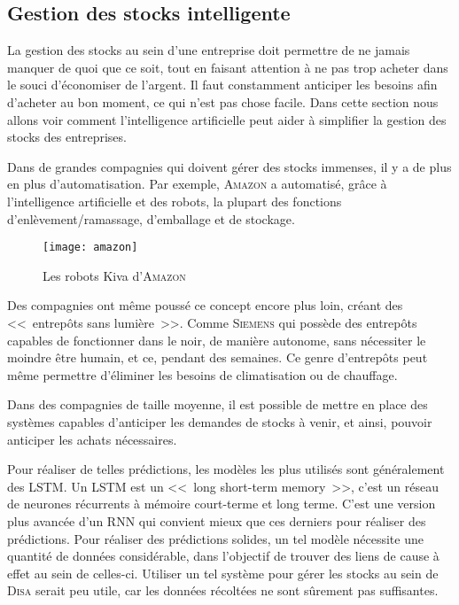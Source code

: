 \subsection{Gestion des stocks intelligente}

La gestion des stocks au sein d'une entreprise doit permettre de ne jamais manquer de quoi que ce soit, tout en faisant attention à ne pas trop acheter dans le souci d'économiser de l'argent.
Il faut constamment anticiper les besoins afin d'acheter au bon moment, ce qui n'est pas chose facile.
Dans cette section nous allons voir comment l'intelligence artificielle peut aider à simplifier la gestion des stocks des entreprises.

Dans de grandes compagnies qui doivent gérer des stocks immenses, il y a de plus en plus d'automatisation.
Par exemple, \textsc{Amazon} a automatisé, grâce à l'intelligence artificielle et des robots, la plupart des fonctions d'enlèvement/ramassage, d'emballage et de stockage.

\FloatBarrier
\begin{figure}[h!]
    \begin{minipage}[c]{0.55\textwidth}
        \begin{center}
            \texttt{[image: amazon]}
        \end{center}
    \end{minipage}\hfill
    \begin{minipage}[c]{0.45\textwidth}
        \caption{Les robots Kiva d'\textsc{Amazon}}
        \label{figure:amazon}
    \end{minipage}
\end{figure}
\FloatBarrier

Des compagnies ont même poussé ce concept encore plus loin, créant des <<~entrepôts sans lumière~>>.
Comme \textsc{Siemens} qui possède des entrepôts capables de fonctionner dans le noir, de manière autonome, sans nécessiter le moindre être humain, et ce, pendant des semaines.
Ce genre d'entrepôts peut même permettre d'éliminer les besoins de climatisation ou de chauffage.

Dans des compagnies de taille moyenne, il est possible de mettre en place des systèmes capables d'anticiper les demandes de stocks à venir, et ainsi, pouvoir anticiper les achats nécessaires.

Pour réaliser de telles prédictions, les modèles les plus utilisés sont généralement des LSTM.
Un LSTM est un <<~long short-term memory~>>, c'est un réseau de neurones récurrents à mémoire court-terme et long terme.
C'est une version plus avancée d'un RNN qui convient mieux que ces derniers pour réaliser des prédictions.
Pour réaliser des prédictions solides, un tel modèle nécessite une quantité de données considérable, dans l'objectif de trouver des liens de cause à effet au sein de celles-ci.
Utiliser un tel système pour gérer les stocks au sein de \textsc{Disa} serait peu utile, car les données récoltées ne sont sûrement pas suffisantes.
